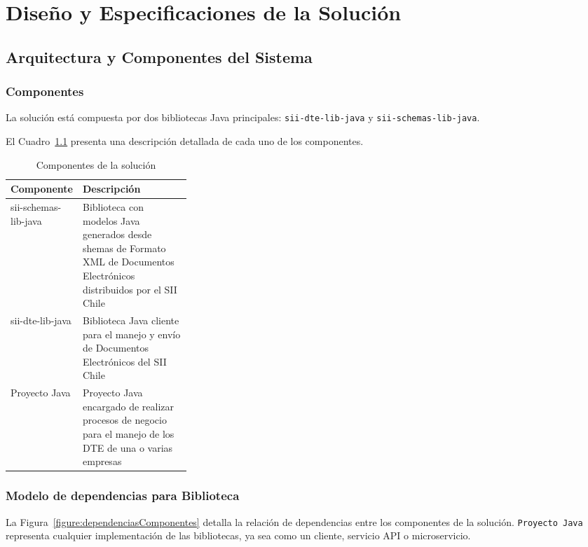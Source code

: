 \chapter{Diseño y Especificaciones de la Solución}

\section{Arquitectura y Componentes del Sistema}

\subsection{Componentes}

La solución está compuesta por dos bibliotecas Java principales: \texttt{sii-dte-lib-java} y \texttt{sii-schemas-lib-java}.

El Cuadro~\ref{tab:componentesSolucion} presenta una descripción detallada de cada uno de los componentes.

\begin{table}
    \centering
    \caption{Componentes de la solución}
    \begin{tabularx}{\linewidth}{|p{0.3\linewidth}|X|}
        \hline
        \textbf{Componente} &
        \textbf{Descripción}\\
        \hline
        sii-schemas-lib-java & Biblioteca con modelos Java generados desde shemas de Formato XML de Documentos Electrónicos distribuidos por el SII Chile \\
        \hline
        sii-dte-lib-java & Biblioteca Java cliente para el manejo y envío de Documentos Electrónicos del SII Chile \\
        \hline
        Proyecto Java & Proyecto Java encargado de realizar procesos de negocio para el manejo de los DTE de una o varias empresas \\
        \hline
    \end{tabularx}
    \label{tab:componentesSolucion}
\end{table}

\subsection{Modelo de dependencias para Biblioteca}

La Figura~\ref{figure:dependenciasComponentes} detalla la relación de dependencias entre los componentes de la solución. \texttt{Proyecto Java} representa cualquier implementación de las bibliotecas, ya sea como un cliente, servicio API o microservicio.

